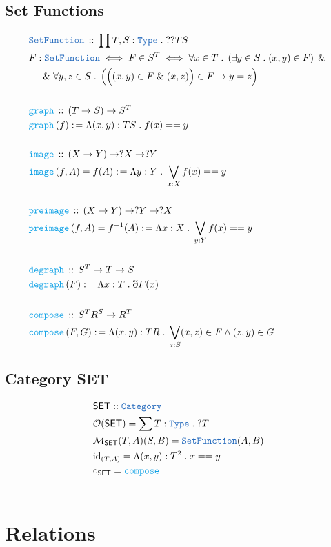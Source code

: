 \documentclass[12pt]{scrartcl}
\newcommand{\TYPE}[1]{\textcolor{NavyBlue}{\mathtt{#1}}}
\newcommand{\FUNC}[1]{\textcolor{Cerulean}{\mathtt{#1}}}
\renewcommand{\.}{\; . \;}
\newcommand{\de}{: \kern 0.1pc =}
\newcommand{\Act}[1]{\left( #1 \right)}
\newcommand{\DeclareType}[2]{& \TYPE{#1} \, :: \, #2 \\}
\newcommand{\DefineNamedType}[4]{& #1 : \TYPE{#2} \iff #3 \iff #4 \\}
\newcommand{\DeclareFunc}[2]{& \FUNC{#1} \, :: \, #2 \\}
\newcommand{\DefineFunc}[3]{&  \FUNC{#1}\Act{#2} \de #3 \\}
\newcommand{\DefineNamedFunc}[4]{&  \FUNC{#1}\Act{#2} = #3 \de #4 \\}
\newcommand{\NewLine}{\\ & \kern 1pc}
\newcommand{\Page}[1]{ \begin{align*} #1 \end{align*}   }
\newcommand{ \bd }{ \ByDef }
\renewcommand{\And}{\; \& \;}
\newcommand{\Type}{\TYPE{Type}}
\newcommand{\Cat}{\TYPE{Category}}
\newcommand{\ByDef}{\eth}
\newcommand{\SET}{\mathsf{SET}}
\begin{document}
\subsection{Set Functions}
\Page{
	\DeclareType{SetFunction}{\prod T,S : \Type \. ??TS}
	\DefineNamedType{F}{SetFunction}
	{ F \in S^T}{  \forall x \in T \. \left(\exists y \in S \. (x,y) \in F \right) \And 
	\NewLine \And
	\forall y,z \in S \.
	\left( \Big( (x,y) \in F \And (x,z) \Big) \in F \rightarrow y = z \right)   }
	\\
	\DeclareFunc{graph}{  (T \to S) \to S^T   }
	\DefineFunc{graph}{f}{ \Lambda (x,y) : TS \.  f(x) == y}
	\\
	\DeclareFunc{image}{ (X \to Y) \to ?X \to ?Y   }
	\DefineNamedFunc{image}{f,A}{f(A)}{\Lambda y : Y \. \bigvee_{x : X} f(x) == y}
	\\
	\DeclareFunc{preimage}{ (X \to Y) \to ?Y \to ?X}
	\DefineNamedFunc{preimage}{f,A}{f^{-1}(A) }
	{ \Lambda x : X \. \bigvee_{y : Y} f(x) == y  }
	\\
	\DeclareFunc{degraph}{ S^T \to T \to S  }
	\DefineFunc{degraph}{F}{ \Lambda x : T \. \bd F (x)}
	\\
	\DeclareFunc{compose}{S^T  R^S \to R^T}
	\DefineFunc{compose}{F,G}
	{ \Lambda (x,y) : TR \. \bigvee_{z : S} (x,z) \in F \wedge (z,y) \in G }
}
\subsection{Category SET} 
\Page{ 
	& \SET :: \Cat \\ 
	& \mathcal{O}(\SET) = \sum T : \Type \. ?T  \\
	& \mathcal{M}_{\SET}(T,A)(S,B) = \TYPE{SetFunction}(A,B) \\
	& \mathrm{id}_{(T,A)} = \Lambda (x,y) : T^2 \. x == y \\
	& \circ_\SET = \FUNC{compose} \\
	\\
}
\section{Relations}
\end{document}
